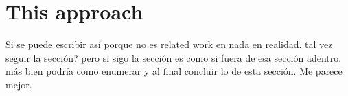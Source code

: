 \section{This approach}

Si se puede escribir así porque no es related work en nada en realidad. tal vez seguir la sección? pero si sigo la sección es como si fuera de esa sección adentro. más bien podría como enumerar y al final concluir lo de esta sección. 
Me parece mejor.

